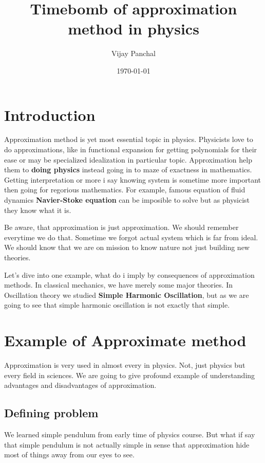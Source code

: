 \documentclass[11pt,a4paper]{article}
\author{Vijay Panchal}
\date{\today}
\title{Timebomb of approximation method in physics}
\begin{document}
\maketitle
\tableofcontents



\section{Introduction}
\label{sec:orgaa9815f}

Approximation method is yet most essential topic in physics. Physicists love to do approximations, like in functional expansion for getting polynomials for their ease or may be specialized idealization in particular topic. Approximation help them to \textbf{doing physics} instead going in to maze of exactness in mathematics. Getting interpretation or more i say knowing system is sometime more important then going for regorious mathematics. For example, famous equation of fluid dynamics \textbf{Navier-Stoke equation} can be imposible to solve but as physicist they know what it is.

Be aware, that approximation is just approximation. We should remember everytime we do that. Sometime we forgot actual system which is far from ideal. We should know that we are on mission to know nature not just building new theories.

Let's dive into one example, what do i imply by consequences of approximation methods. In classical mechanics, we have merely some major theories. In Oscillation theory we studied \textbf{Simple Harmonic Oscillation}, but as we are going to see that simple harmonic oscillation is not exactly that simple. 



\section{Example of Approximate method}
\label{sec:org39072e6d}

Approximation is very used in almost every in physics. Not, just physics but every field in sciences. We are going to give profound example of understanding advantages and disadvantages of approximation.

\subsection{Defining problem}
\label{sec:org18c8fc9}

We learned simple pendulum from early time of physics course. But what if say that simple pendulum is not actually simple in sense that approximation hide most of things away from our eyes to see.
\end{document}
